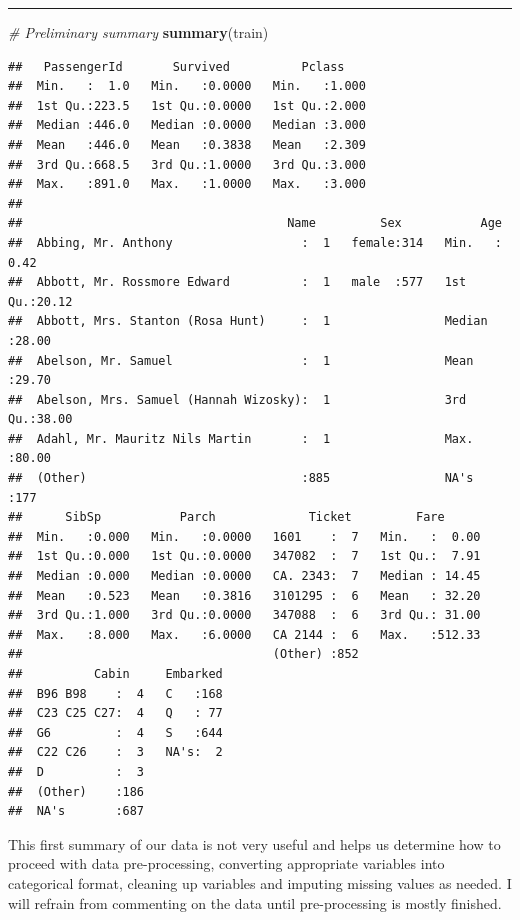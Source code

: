 \documentclass[]{article}
\newenvironment{Shaded}{\begin{snugshade}}{\end{snugshade}}
\newcommand{\KeywordTok}[1]{\textcolor[rgb]{0.13,0.29,0.53}{\textbf{#1}}}
\newcommand{\CommentTok}[1]{\textcolor[rgb]{0.56,0.35,0.01}{\textit{#1}}}
\newcommand{\NormalTok}[1]{#1}
\begin{document}
\begin{center}\rule{0.5\linewidth}{\linethickness}\end{center}

\begin{Shaded}
\begin{Highlighting}[]
\CommentTok{# Preliminary summary}
\KeywordTok{summary}\NormalTok{(train)}
\end{Highlighting}
\end{Shaded}

\begin{verbatim}
##   PassengerId       Survived          Pclass     
##  Min.   :  1.0   Min.   :0.0000   Min.   :1.000  
##  1st Qu.:223.5   1st Qu.:0.0000   1st Qu.:2.000  
##  Median :446.0   Median :0.0000   Median :3.000  
##  Mean   :446.0   Mean   :0.3838   Mean   :2.309  
##  3rd Qu.:668.5   3rd Qu.:1.0000   3rd Qu.:3.000  
##  Max.   :891.0   Max.   :1.0000   Max.   :3.000  
##                                                  
##                                     Name         Sex           Age       
##  Abbing, Mr. Anthony                  :  1   female:314   Min.   : 0.42  
##  Abbott, Mr. Rossmore Edward          :  1   male  :577   1st Qu.:20.12  
##  Abbott, Mrs. Stanton (Rosa Hunt)     :  1                Median :28.00  
##  Abelson, Mr. Samuel                  :  1                Mean   :29.70  
##  Abelson, Mrs. Samuel (Hannah Wizosky):  1                3rd Qu.:38.00  
##  Adahl, Mr. Mauritz Nils Martin       :  1                Max.   :80.00  
##  (Other)                              :885                NA's   :177    
##      SibSp           Parch             Ticket         Fare       
##  Min.   :0.000   Min.   :0.0000   1601    :  7   Min.   :  0.00  
##  1st Qu.:0.000   1st Qu.:0.0000   347082  :  7   1st Qu.:  7.91  
##  Median :0.000   Median :0.0000   CA. 2343:  7   Median : 14.45  
##  Mean   :0.523   Mean   :0.3816   3101295 :  6   Mean   : 32.20  
##  3rd Qu.:1.000   3rd Qu.:0.0000   347088  :  6   3rd Qu.: 31.00  
##  Max.   :8.000   Max.   :6.0000   CA 2144 :  6   Max.   :512.33  
##                                   (Other) :852                   
##          Cabin     Embarked  
##  B96 B98    :  4   C   :168  
##  C23 C25 C27:  4   Q   : 77  
##  G6         :  4   S   :644  
##  C22 C26    :  3   NA's:  2  
##  D          :  3             
##  (Other)    :186             
##  NA's       :687
\end{verbatim}

This first summary of our data is not very useful and helps us determine
how to proceed with data pre-processing, converting appropriate
variables into categorical format, cleaning up variables and imputing
missing values as needed. I will refrain from commenting on the data
until pre-processing is mostly finished.
\end{document}
